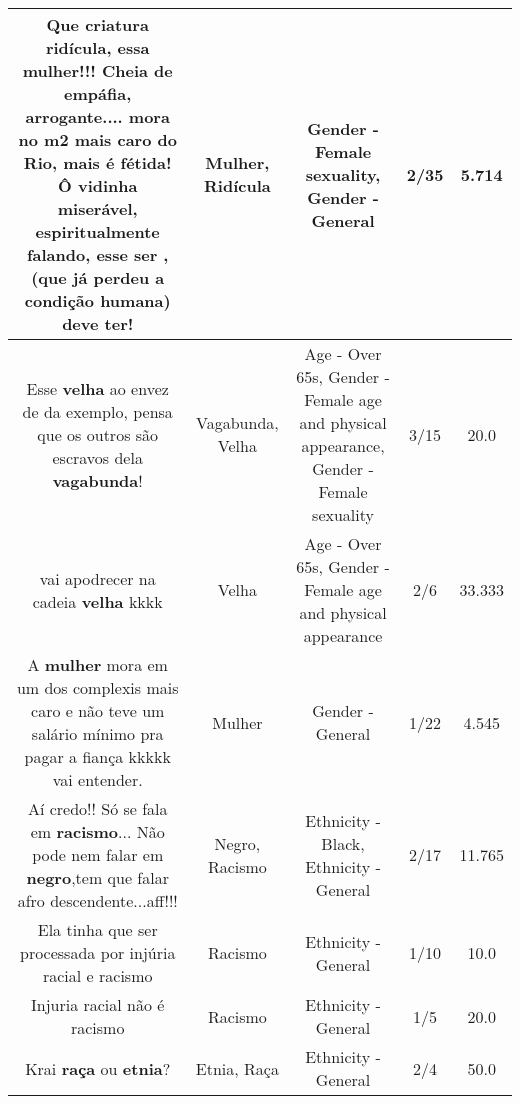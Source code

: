 \documentclass[11pt]{article}
\newlength\mylength
\begin{document}
\begin{center}
\begin{longtable}{|C{.65\mylength}|C{.30\mylength}|C{.12\mylength}|C{.12\mylength}|C{.12\mylength}|}
  \small Que criatura \textbf{ridícula}, essa \textbf{mulher}!!! Cheia de empáfia, arrogante.... mora no m2 mais caro do Rio, mais é fétida! Ô vidinha miserável,  espiritualmente falando, esse ser , (que já perdeu a condição humana) deve ter!\normalsize   & Mulher, Ridícula & Gender - Female sexuality, Gender - General & 2/35 & 5.714 \\  \hline
  \small Esse \textbf{v\textbf{elha}} ao envez de da exemplo, pensa que os outros são escravos dela \textbf{vagabunda}!\normalsize   & Vagabunda, Velha & Age - Over 65s, Gender - Female age and physical appearance, Gender - Female sexuality & 3/15 & 20.0 \\  \hline
  \small vai apodrecer na cadeia \textbf{v\textbf{elha}}  kkkk\normalsize   & Velha & Age - Over 65s, Gender - Female age and physical appearance & 2/6 & 33.333 \\  \hline
  \small A \textbf{mulher} mora em um dos complexis mais caro e não teve um salário mínimo pra pagar a fiança kkkkk vai entender.\normalsize   & Mulher & Gender - General & 1/22 & 4.545 \\  \hline
  \small Aí credo!! Só se fala em \textbf{racismo}... Não pode nem falar em \textbf{negro},tem que falar afro descendente...aff!!!\normalsize   & Negro, Racismo & Ethnicity - Black, Ethnicity - General & 2/17 & 11.765 \\  \hline
  \small Ela tinha que ser processada por injúria racial  e racismo\normalsize   & Racismo & Ethnicity - General & 1/10 & 10.0 \\  \hline
  \small Injuria racial não é racismo\normalsize   & Racismo & Ethnicity - General & 1/5 & 20.0 \\  \hline
  \small Krai \textbf{raça} ou \textbf{etnia}?\normalsize   & Etnia, Raça & Ethnicity - General & 2/4 & 50.0 \\  \hline

\end{longtable}
\end{center}
\end{document}
